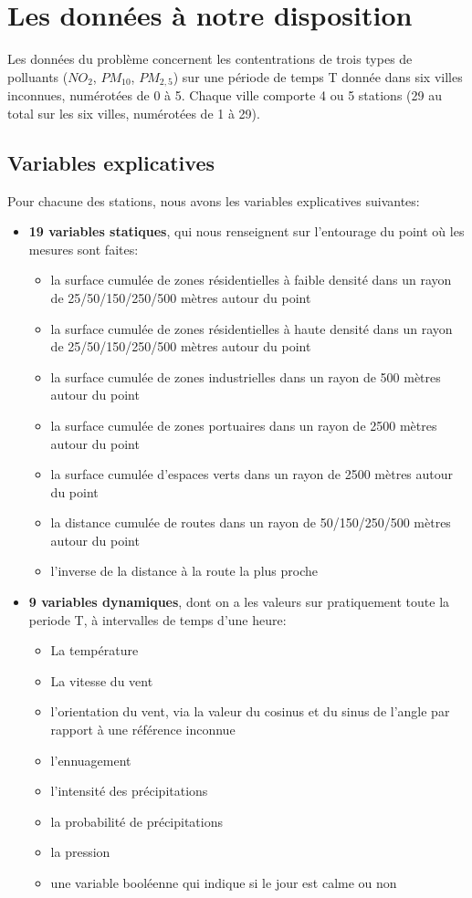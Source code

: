 \section{Les données à notre disposition}

Les données du problème concernent les contentrations de trois types de polluants ($NO_2$, $PM_{10}$, $PM_{2,5}$) sur une période de temps T donnée dans six villes inconnues, numérotées de 0 à 5.
Chaque ville comporte 4 ou 5 stations (29 au total sur les six villes, numérotées de 1 à 29).

\subsection{Variables explicatives}

Pour chacune des stations, nous avons les variables explicatives suivantes:
\begin{itemize}
  \item \textbf{19 variables statiques}, qui nous renseignent sur l'entourage du point où les mesures sont faites:
  \begin{itemize}
    \item la surface cumulée de zones résidentielles à faible densité dans un rayon de 25/50/150/250/500 mètres autour du point
    \item la surface cumulée de zones résidentielles à haute densité dans un rayon de 25/50/150/250/500 mètres autour du point
    \item la surface cumulée de zones industrielles dans un rayon de 500 mètres autour du point
    \item la surface cumulée de zones portuaires dans un rayon de 2500 mètres autour du point
    \item la surface cumulée d'espaces verts dans un rayon de 2500 mètres autour du point
    \item la distance cumulée de routes dans un rayon de 50/150/250/500 mètres autour du point
    \item l'inverse de la distance à la route la plus proche
  \end{itemize}
  \item \textbf{9 variables dynamiques}, dont on a les valeurs sur pratiquement toute la periode T, à intervalles de temps d'une heure:
  \begin{itemize}
    \item La température
    \item La vitesse du vent
    \item l'orientation du vent, via la valeur du cosinus et du sinus de l'angle par rapport à une référence inconnue
    \item l'ennuagement
    \item l'intensité des précipitations
    \item la probabilité de précipitations
    \item la pression
    \item une variable booléenne qui indique si le jour est calme ou non
  \end{itemize}
\end{itemize}

